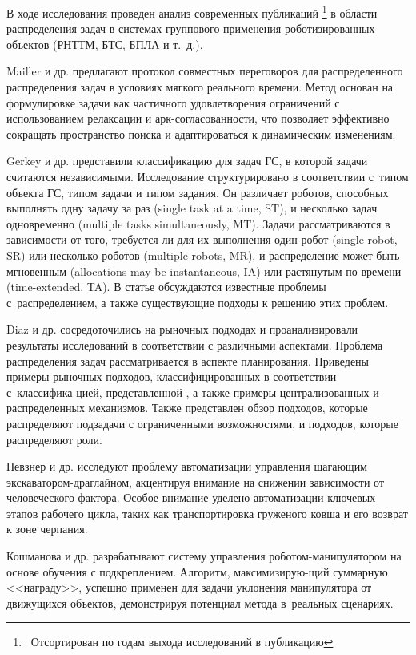 В ходе исследования проведен анализ современных публикаций \footnote{\ Отсортирован по годам выхода исследований в публикацию} в области распределения задач в системах группового применения роботизированных объектов (РНТТМ, БТС, БПЛА и т.\ д.).

Mailler и др. \cite{MaillerLesserHorling2003} предлагают протокол совместных переговоров для распределенного распределения задач в условиях мягкого реального времени. Метод основан на формулировке задачи как частичного удовлетворения ограничений с использованием релаксации и арк-согласованности, что позволяет эффективно сокращать пространство поиска и адаптироваться к динамическим изменениям.

Gerkey и др. \cite{gerkey2004formal} представили классификацию для задач ГС, в которой задачи считаются независимыми. Исследование структурировано в соответствии с~типом объекта ГС, типом задачи и типом задания. Он различает роботов, способных выполнять одну задачу за раз (single task at a time, ST), и несколько задач одновременно (multiple tasks simultaneously, MT). Задачи рассматриваются в зависимости от того, требуется ли для их выполнения один робот (single robot, SR) или несколько роботов (multiple robots, MR), и распределение может быть мгновенным (allocations may be instantaneous, IA) или растянутым по времени (time-extended, TA). В статье обсуждаются известные проблемы с~распределением, а также существующие подходы к решению этих проблем.

Diaz и др. \cite{dias2006market} сосредоточились на рыночных подходах и проанализировали результаты исследований в соответствии с различными аспектами. Проблема распределения задач рассматривается в аспекте планирования. Приведены примеры рыночных подходов, классифицированных в соответствии с~классифика-цией, представленной \cite{gerkey2004formal}, а также примеры централизованных и распределенных механизмов. Также представлен обзор подходов, которые распределяют подзадачи с ограниченными возможностями, и подходов, которые распределяют роли.

Певзнер и др. \cite{PevznerUgaiSulemanov2010} исследуют проблему автоматизации управления шагающим экскаватором-драглайном, акцентируя внимание на снижении зависимости от человеческого фактора. Особое внимание уделено автоматизации ключевых этапов рабочего цикла, таких как транспортировка груженого ковша и его возврат к зоне черпания.

Кошманова и др. \cite{KoshmanovaTrifonovPavlovskii2012} разрабатывают систему управления роботом-манипулятором на основе обучения с подкреплением. Алгоритм, максимизирую-щий суммарную <<награду>>, успешно применен для задачи уклонения манипулятора от движущихся объектов, демонстрируя потенциал метода в~реальных сценариях.

